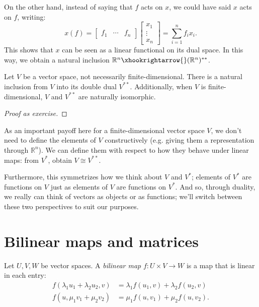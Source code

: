 On the other hand, instead of saying that $f$ acts on $x$, we could
have said $x$ acts on $f$, writing: 
\[x(f) = \begin{bmatrix} f_1 & \dotsm &
  f_n \end{bmatrix} \begin{bmatrix} x_1 \\ \vdots \\ x_n \end{bmatrix}
= \sum_{i=1}^n f_i x_i.\] 
This shows that $x$ can be seen as a linear functional on its dual
space. In this way, we obtain a natural inclusion $\mathbb{R}^n
\xhookrightarrow{} (\mathbb{R}^n)^{**}$. 
\begin{proposition}
  Let $V$ be a vector space, not necessarily finite-dimensional. There
  is a natural inclusion from $V$ into its double dual
  $V^{**}$. Additionally, when $V$ is finite-dimensional, $V$ and
  $V^{**}$ are naturally isomorphic. 
\end{proposition}
\begin{proof}[Proof as exercise]
\end{proof}

As an important payoff here for a finite-dimensional vector space $V$,
we don't need to define the elements of $V$ constructively
(e.g. giving them a representation through $\mathbb{R}^n$). We can
define them with respect to how they behave under linear maps: from
$V^*$, obtain $V \cong V^{**}$. 

Furthermore, this symmetrizes how we think about $V$ and $V^*$;
elements of $V^*$ are functions on $V$ just as elements of $V$ are
functions on $V^*$. And so, through duality, we really can think of
vectors as objects or as functions; we'll switch between these two
perspectives to suit our purposes. 

\section{Bilinear maps and matrices}
\begin{definition}
Let $U,V, W$ be vector spaces. A \emph{bilinear map} $f : U \times V
\to W$ is a map that is linear in each entry: 
\begin{align*} f(\lambda_1 u_1 + \lambda_2 u_2, v) &= \lambda_1 f(u_1,
  v) + \lambda_2 f(u_2, v)\\ 
f(u,\mu_1 v_1 + \mu_2 v_2) &= \mu_1 f(u,v_1) + \mu_2
f(u,v_2).\end{align*} 
\end{definition}

